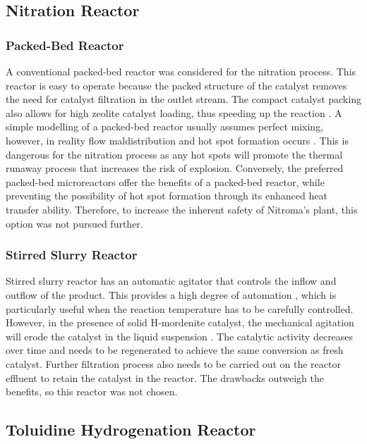 \subsection{Nitration Reactor}
\label{nitrationreactor}
\subsubsection{Packed-Bed Reactor}
A conventional packed-bed reactor was considered for the nitration process. This reactor is easy to operate because the packed structure of the catalyst removes the need for catalyst filtration in the outlet stream. The compact catalyst packing also allows for high zeolite catalyst loading, thus speeding up the reaction \cite{kashid_microstructured_2009}. A simple modelling of a packed-bed reactor usually assumes perfect mixing, however, in reality flow maldistribution and hot spot formation occurs \cite{nguyen_flow_1994}. This is dangerous for the nitration process as any hot spots will promote the thermal runaway process that increases the risk of explosion. Conversely, the preferred packed-bed microreactors offer the benefits of a packed-bed reactor, while preventing the possibility of hot spot formation through its enhanced heat transfer ability. Therefore, to increase the inherent safety of Nitroma's plant, this option was not pursued further.

\subsubsection{Stirred Slurry Reactor}
Stirred slurry reactor has an automatic agitator that controls the inflow and outflow of the product. This provides a high degree of automation \cite{liu_nitration_2019}, which is particularly useful when the reaction temperature has to be carefully controlled. However, in the presence of solid H-mordenite catalyst, the mechanical agitation will erode the catalyst in the liquid suspension \cite{argyle_heterogeneous_2015}. The catalytic activity decreases over time and needs to be regenerated to achieve the same conversion as fresh catalyst. Further filtration process also needs to be carried out on the reactor effluent to retain the catalyst in the reactor. The drawbacks outweigh the benefits, so this reactor was not chosen.

\subsection{Toluidine Hydrogenation Reactor}

